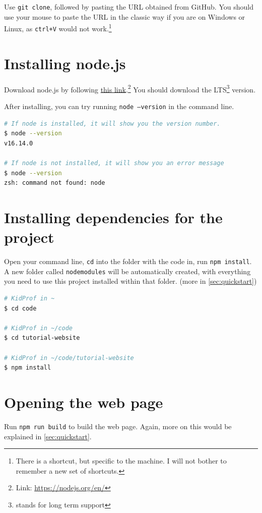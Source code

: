 Use \texttt{git clone}, followed by pasting the URL obtained from GitHub. You should use your mouse to paste the URL in the classic way if you are on Windows or Linux, as \texttt{ctrl+V} would not work.\footnote{There is a shortcut, but specific to the machine. I will not bother to remember a new set of shortcuts.}

\section{Installing node.js}
\label{sec:install7}

Download node.js by following \href{https://nodejs.org/en/}{this link}.\footnote{Link: \url{https://nodejs.org/en/}} You should download the LTS\footnote{stands for long term support} version.

After installing, you can try running \texttt{node --version} in the command line.

\begin{lstlisting}[language=bash]
# If node is installed, it will show you the version number.
$ node --version
v16.14.0

# If node is not installed, it will show you an error message
$ node --version
zsh: command not found: node
\end{lstlisting}

\section{Installing dependencies for the project}

Open your command line, \texttt{cd} into the folder with the code in, run \texttt{npm install}. A new folder called \texttt{node\textunderscore modules} will be automatically created, with everything you need to use this project installed within that folder. (more in \cref{sec:quickstart})

\begin{lstlisting}[language=bash]
# KidProf in ~
$ cd code

# KidProf in ~/code
$ cd tutorial-website

# KidProf in ~/code/tutorial-website
$ npm install
\end{lstlisting}

\section{Opening the web page}

Run \texttt{npm run build} to build the web page. Again, more on this would be explained in \cref{sec:quickstart}.
\vspace{6mm}

